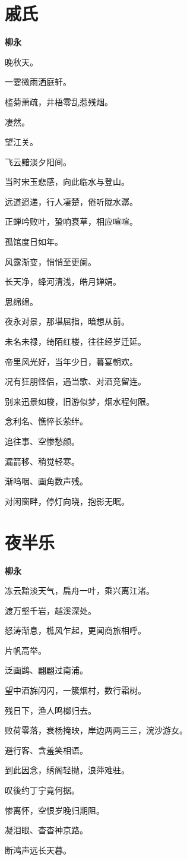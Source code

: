 \documentclass[12pt,a4paper]{ctexbook}
\begin{document}
\section{戚氏}
\textbf{柳永}\par\vspace{0.5em}
晚秋天。\par
一霎微雨洒庭轩。\par
槛菊萧疏，井梧零乱惹残烟。\par
凄然。\par
望江关。\par
飞云黯淡夕阳间。\par
当时宋玉悲感，向此临水与登山。\par
远道迢递，行人凄楚，倦听陇水潺。\par
正蝉吟败叶，蛩响衰草，相应喧喧。\par
孤馆度日如年。\par
风露渐变，悄悄至更阑。\par
长天净，绛河清浅，皓月婵娟。\par
思绵绵。\par
夜永对景，那堪屈指，暗想从前。\par
未名未禄，绮陌红楼，往往经岁迁延。\par
帝里风光好，当年少日，暮宴朝欢。\par
况有狂朋怪侣，遇当歌、对酒竞留连。\par
别来迅景如梭，旧游似梦，烟水程何限。\par
念利名、憔悴长萦绊。\par
追往事、空惨愁颜。\par
漏箭移、稍觉轻寒。\par
渐呜咽、画角数声残。\par
对闲窗畔，停灯向晓，抱影无眠。\par

\section{夜半乐}
\textbf{柳永}\par\vspace{0.5em}
冻云黯淡天气，扁舟一叶，乘兴离江渚。\par
渡万壑千岩，越溪深处。\par
怒涛渐息，樵风乍起，更闻商旅相呼。\par
片帆高举。\par
泛画鹢、翩翩过南浦。\par
望中酒旆闪闪，一簇烟村，数行霜树。\par
残日下，渔人鸣榔归去。\par
败荷零落，衰杨掩映，岸边两两三三，浣沙游女。\par
避行客、含羞笑相语。\par
到此因念，绣阁轻抛，浪萍难驻。\par
叹後约丁宁竟何据。\par
惨离怀，空恨岁晚归期阻。\par
凝泪眼、杳杳神京路。\par
断鸿声远长天暮。\par
\end{document}
